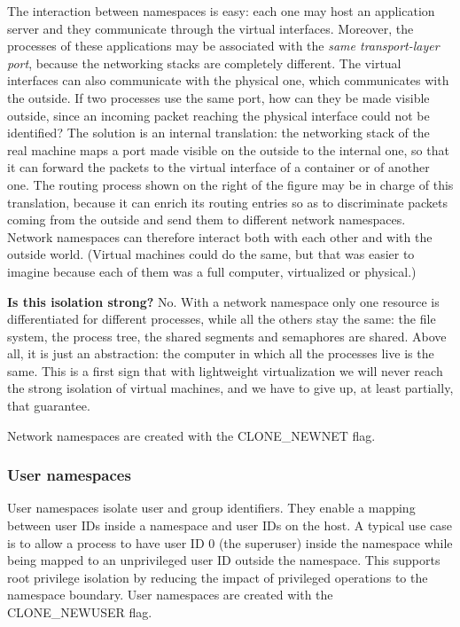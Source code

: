 The interaction between namespaces is easy: each one may host an application server and they communicate through the virtual interfaces. Moreover, the processes of these applications may be associated with the \emph{same transport-layer port}, because the networking stacks are completely different. The virtual interfaces can also communicate with the physical one, which communicates with the outside. If two processes use the same port, how can they be made visible outside, since an incoming packet reaching the physical interface could not be identified? The solution is an internal translation: the networking stack of the real machine maps a port made visible on the outside to the internal one, so that it can forward the packets to the virtual interface of a container or of another one. The routing process shown on the right of the figure may be in charge of this translation, because it can enrich its routing entries so as to discriminate packets coming from the outside and send them to different network namespaces. Network namespaces can therefore interact both with each other and with the outside world. (Virtual machines could do the same, but that was easier to imagine because each of them was a full computer, virtualized or physical.)

\begin{center}
\end{center}

\begin{notebox}
	\textbf{Is this isolation strong?} No. With a network namespace only one resource is differentiated for different processes, while all the others stay the same: the file system, the process tree, the shared segments and semaphores are shared. Above all, it is just an abstraction: the computer in which all the processes live is the same. This is a first sign that with lightweight virtualization we will never reach the strong isolation of virtual machines, and we have to give up, at least partially, that guarantee.
\end{notebox}

Network namespaces are created with the CLONE\_NEWNET flag.

\subsubsection*{User namespaces}

User namespaces isolate user and group identifiers. They enable a mapping between user IDs inside a namespace and user IDs on the host. A typical use case is to allow a process to have user ID 0 (the superuser) inside the namespace while being mapped to an unprivileged user ID outside the namespace. This supports root privilege isolation by reducing the impact of privileged operations to the namespace boundary. User namespaces are created with the CLONE\_NEWUSER flag.


